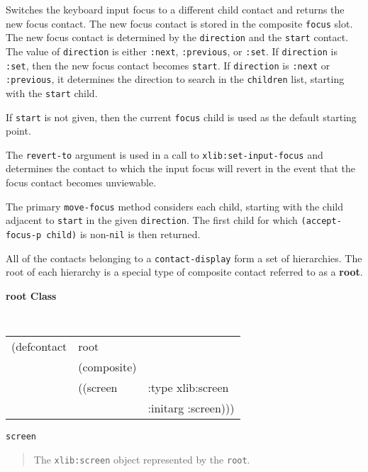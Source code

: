 \begin{flushright} \parbox[t]{6.125in}{
Switches the keyboard input focus to a different child contact and returns the new focus
contact. The new focus contact is stored in the composite {\tt focus} slot.
The new focus contact is determined by the {\tt direction} and the {\tt start}
contact. The value of {\tt direction} is either {\tt :next}, {\tt :previous}, or
{\tt :set}. If {\tt direction} is {\tt :set}, then the new focus contact becomes
{\tt start}. If {\tt direction} is {\tt :next} or {\tt :previous}, it determines
the direction to search in the {\tt children} list, starting with
the {\tt start} child. 

If {\tt start} is not given, then the current {\tt focus}
child is used as the default starting point.

The {\tt revert-to} argument is used in a call to {\tt xlib:set-input-focus} and
determines the contact to which the input focus will revert in the event that
the focus contact becomes unviewable.

The primary {\tt move-focus} method considers each child, starting with
the child adjacent to {\tt start}
in the given {\tt direction}. The first child for which {\tt (accept-focus-p
child)} is non-{\tt nil} is then returned.

}\end{flushright}





All of the contacts belonging to a {\tt contact-display} form a set of
hierarchies. The root of each hierarchy is a special type of composite contact
referred to as a {\bf root}.


{\samepage
{\large {\bf root \hfill Class}} 
\begin{flushright} \parbox[t]{6.125in}{
\tt
\begin{tabular}{lll}
\raggedright
(defcontact & root  & \\ 
& (composite) & \\
&((screen & :type xlib:screen\\ 
&          & :initarg :screen)))
\end{tabular}
\rm

}\end{flushright}}

\begin{flushright} \parbox[t]{6.125in}{
{\tt screen}
\begin{quote}
The {\tt xlib:screen} object represented by the {\tt root}.
\end{quote}

}\end{flushright}



